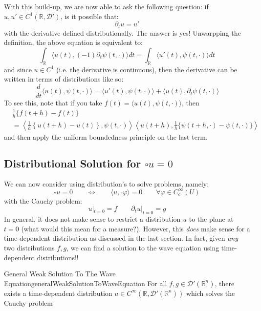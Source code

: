 \documentclass{book}
\newcommand{\R}{{\mathbb{R}}}
\newcommand{\CD}{{\mathcal{D}}}
\renewcommand{\phi}{\varphi}
\newcommand{\LRw}{\Leftrightarrow}
\begin{document}
With this build-up, we are now able to ask the following question: if $u, u' \in C^1(\R, \CD')$, is it possible that:
\[
	 \partial_t u = u'
\]
with the derivative defined distributionally. The answer is yes! Unwarpping the definition, the above equation is
equivalent to:
\[
	\int_\R \langle u(t), (-1)  \partial_t \psi(t, \cdot)\rangle dt = \int_\R \langle u'(t), \psi(t, \cdot)\rangle dt
\]
and since $u \in C^1$ (i.e. the derivative is continuous), then the derivative can be written in terms of distributions
like so:
\[
	\frac{d}{dt} \langle u(t), \psi(t, \cdot) \rangle = \langle u'(t), \psi(t, \cdot) \rangle + \langle u(t),
	\partial_t \psi(t, \cdot) \rangle
\]
To see this, note that if you take $f(t) = \langle u(t), \psi(t, \cdot) \rangle$, then
\begin{align*}
	&\frac{1}{h} \{f(t+h) - f(t)\}\\
	&= \left\langle  \frac{1}{h} \left\{  u(t+h) - u(t)\right\}, \psi(t, \cdot)  \right\rangle \left\langle u(t+h), \frac{1}{h} \{\psi(t+h, \cdot) - \psi(t, \cdot)\} \right\rangle
\end{align*}
and then apply the uniform boundedness principle on the last term.

\subsection[Distributional Solution for wave equation]{Distributional Solution for $\square u =0$}

We can now consider using distribution's to solve problems, namely:
\[
	\square u = 0 \qquad \LRw \qquad \langle u, \square \phi\rangle = 0 \qquad \forall \phi \in C_c^\infty(U)
\]
with the Cauchy problem:
\[
	u|_{t=0} =f \qquad  \partial_t u|_{t=0} = g
\]
In general, it does not make sense to restrict a distribution $u$ to the plane at $t =0$ (what would this mean for
a measure?). However, this \emph{does} make sense for a time-dependent distribution as discussed in the last section. In
fact, given \emph{any} two distributions $f,g$, we can find a solution to the wave equation using time-dependent
distributions!!

\begin{thm}{General Weak Solution To The Wave Equation}{generalWeakSolutionToWaveEquation}
	For all $f,g \in \CD'(\R^n)$, there exists a time-dependent distribution $u \in C^\infty(\R, \CD'(\R^n))$ which
	solves the Cauchy problem
\end{thm}
\end{document}
